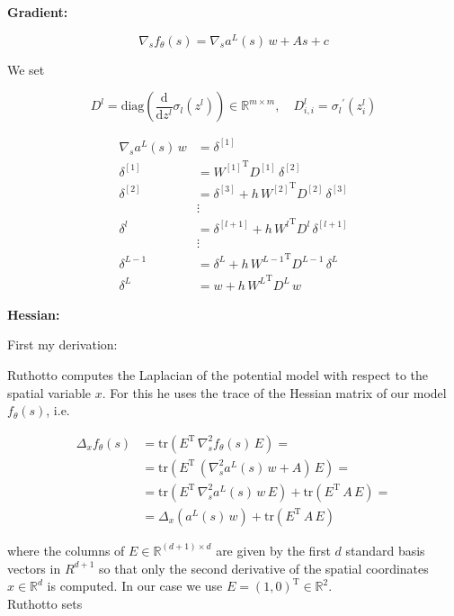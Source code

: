 \textbf{Gradient:}

\begin{equation*}
    \nabla_s f_{\theta}(s) = \nabla_s a^{L}(s) \, w + A s + c
\end{equation*}

We set

\begin{equation*}
    D^{l} = \mathrm{diag} \left( \frac{\mathrm{d}}{\mathrm{d}z^{l}} \sigma_{l} (z^{l}) \right) \in \mathbb{R}^{m \times m}, \quad D_{i, i}^{l} = {\sigma_{l}}^{\prime} (z_{i}^{l})
\end{equation*}

\begin{align*}
    \nabla_s a^{L}(s) \, w & = \delta^{[1]}  \\
    \delta^{[1]} & = {W^{[1]}}^{\mathrm{T}} D^{[1]} \, \delta^{[2]} \\
    \delta^{[2]} & = \delta^{[3]} + h \, {W^{[2]}}^{\mathrm{T}} D^{[2]} \, \delta^{[3]} \\
    &\vdots\\
    \delta^{l} & = \delta^{[l+1]} + h \, {W^{l}}^{\mathrm{T}} D^{l} \, \delta^{[l+1]} \\
    &\vdots\\
    \delta^{L-1} & = \delta^{L} + h \, {W^{L-1}}^{\mathrm{T}} D^{L-1} \, \delta^{L} \\
    \delta^{L} & = w + h \, {W^{L}}^{\mathrm{T}} D^{L} \, w
\end{align*}


\textbf{Hessian:}

First my derivation:

Ruthotto computes the Laplacian of the potential model with respect to the spatial variable $x$. For this he uses the trace of the Hessian matrix of our model $f_{\theta}(s)$, i.e. 

\begin{align*}
    \Delta_x f_{\theta}(s) & = \mathrm{tr}(E^{\mathrm{T}} \, \nabla^{2}_s f_{\theta}(s) \, E) = \\
    & = \mathrm{tr}(E^{\mathrm{T}} \, (\nabla^{2}_s a^{L}(s) \, w + A) \, E) = \\
    & = \mathrm{tr}(E^{\mathrm{T}} \, \nabla^{2}_s a^{L}(s) \, w \, E) + \mathrm{tr}(E^{\mathrm{T}} \,  A \, E) = \\
    & = \Delta_x (a^{L}(s) \, w) + \mathrm{tr}(E^{\mathrm{T}} \,  A \, E)
\end{align*}

where the columns of $E \in \mathbb{R}^{(d+1) \times d}$ are given by the first $d$ standard basis vectors in $R^{d+1}$ so that only the second derivative of the spatial coordinates $x \in \mathbb{R}^d$ is computed. In our case we use $E = (1, 0)^{\mathrm{T}} \in \mathbb{R}^{2}$. \\
Ruthotto sets

